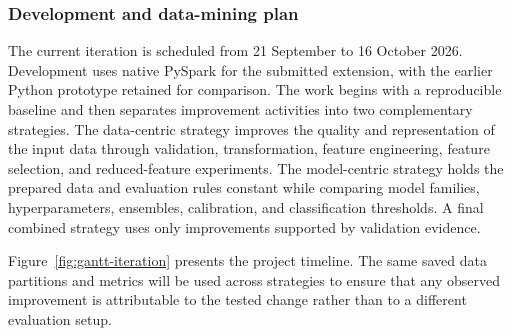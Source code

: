 \subsubsection{Development and data-mining plan}
The current iteration is scheduled from 21 September to 16 October 2026. Development uses native PySpark for the submitted extension, with the earlier Python prototype retained for comparison. The work begins with a reproducible
baseline and then separates improvement activities into two complementary
strategies. The data-centric strategy improves the quality and representation
of the input data through validation, transformation, feature engineering,
feature selection, and reduced-feature experiments. The model-centric strategy
holds the prepared data and evaluation rules constant while comparing model
families, hyperparameters, ensembles, calibration, and classification
thresholds. A final combined strategy uses only improvements supported by
validation evidence.

Figure~\ref{fig:gantt-iteration} presents the project timeline. The same saved
data partitions and metrics will be used across strategies to ensure that any
observed improvement is attributable to the tested change rather than to a
different evaluation setup.

